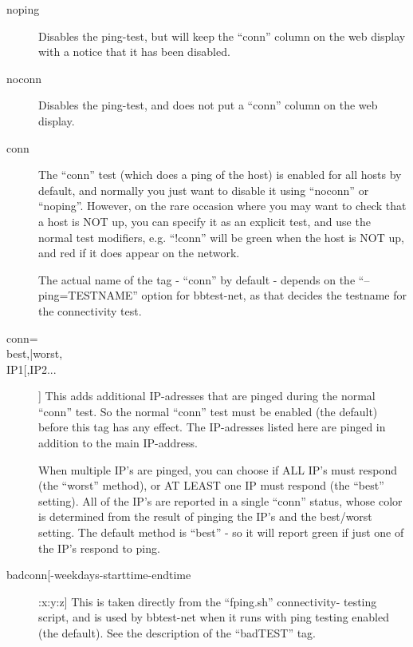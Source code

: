  \begin{description}
\item[noping] Disables the ping-test, but will keep the ``conn'' column on the web display with a notice that it has been disabled. 

 

\item[noconn] Disables the ping-test, and does not put a ``conn'' column on the web display. 

 

\item[conn] The ``conn'' test (which does a ping of the host) is
  enabled for all hosts by default, and normally you just want to
  disable it using ``noconn'' or ``noping''. However, on the rare
  occasion where you may want to check that a host is NOT up, you can
  specify it as an explicit test, and use the normal test modifiers,
  e.g. ``!conn'' will be green when the host is NOT up, and red if it
  does appear on the network. 


  The actual name of the tag - ``conn'' by default - depends on the ``--ping=TESTNAME'' option for bbtest-net, as that decides the testname for the connectivity test. 


 

\item[conn=\\{best,|worst,\\}IP1[,IP2...]] This adds additional
  IP-adresses that are pinged during the normal ``conn'' test. So the
  normal ``conn'' test must be enabled (the default) before this tag
  has any effect. The IP-adresses listed here are pinged in addition
  to the main IP-address. 


  When multiple IP's are pinged, you can choose if ALL IP's must
  respond (the ``worst'' method), or AT LEAST one IP must respond (the
  ``best'' setting). All of the IP's are reported in a single ``conn''
  status, whose color is determined from the result of pinging the
  IP's and the best/worst setting. The default method is ``best'' - so
  it will report green if just one of the IP's respond to ping. 



 

\item[badconn[-weekdays-starttime-endtime]:x:y:z] This is taken
  directly from the ``fping.sh'' connectivity- testing script, and is
  used by bbtest-net when it runs with ping testing enabled (the
  default). See the description of the ``badTEST'' tag. 



\end{description}
